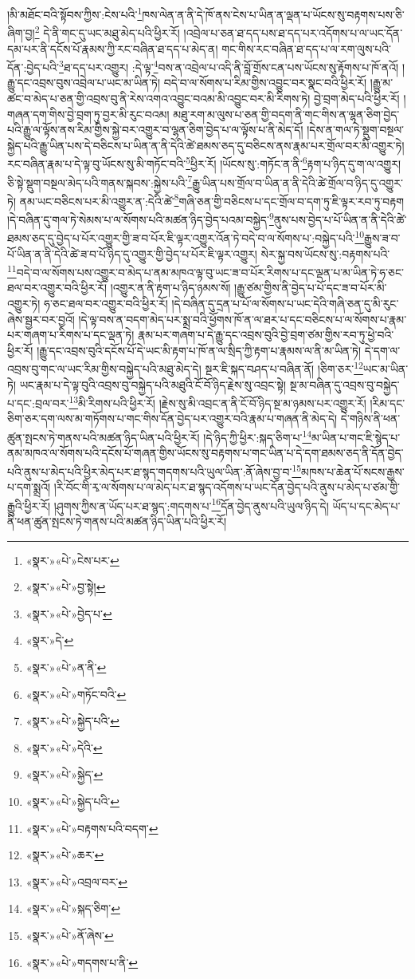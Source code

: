 །མི་མཐོང་བའི་སྟོབས་ཀྱིས་:ངེས་པའི་\footnote{«སྣར་»«པེ་»ངེས་པར་}ཁས་ལེན་ན་ནི་དེ་ཁོ་ནས་ངེས་པ་ཡིན་ན་ལྡན་པ་ཡོངས་སུ་བརྟགས་པས་ཅི་ཞིག་བྱ།\footnote{«སྣར་»«པེ་»བྱ་སྟེ།} དེ་ནི་གང་དུ་ཡང་མཐུ་མེད་པའི་ཕྱིར་རོ། །འབྲེལ་པ་ཅན་ཐ་དད་པས་ཐ་དད་པར་འདོགས་པ་ལ་ཡང་དོན་དམ་པར་ནི་དངོས་པོ་རྣམས་ཀྱི་རང་བཞིན་ཐ་དད་པ་མེད་ན། གང་གིས་རང་བཞིན་ཐ་དད་པ་ལ་རག་ལུས་པའི་དོན་:བྱེད་པའི་\footnote{«སྣར་»«པེ་»བྱེད་པ་}ཐ་དད་པར་འགྱུར། :དེ་ལྟ་\footnote{«སྣར་»དེ་}བས་ན་འབྲེལ་པ་འདི་ནི་བློ་གྲོས་ངན་པས་ཡོངས་སུ་རྟོགས་པ་ཁོ་ནའོ། །རྒྱུ་དང་འབྲས་བུས་འབྲེལ་པ་ཡང་མ་ཡིན་ཏེ། བདེ་བ་ལ་སོགས་པ་རིམ་གྱིས་འབྱུང་བར་སྣང་བའི་ཕྱིར་རོ། །རྒྱུ་མ་ཚང་བ་མེད་པ་ཅན་གྱི་འབྲས་བུ་ནི་རེས་འགའ་འབྱུང་བའམ་མི་འབྱུང་བར་མི་རིགས་ཏེ། བྱེ་བྲག་མེད་པའི་ཕྱིར་རོ། །གཞན་དག་གིས་བྱེ་བྲག་ཏུ་བྱར་མི་རུང་བའམ། མཐུ་རག་མ་ལུས་པ་ཅན་གྱི་བདག་ནི་གང་གིས་ན་ལྷན་ཅིག་བྱེད་པའི་རྒྱུ་ལ་ལྟོས་ནས་རིམ་གྱིས་སྐྱེ་བར་འགྱུར་བ་ལྷན་ཅིག་བྱེད་པ་ལ་ལྟོས་པ་ནི་མེད་དོ། །དེས་ན་གལ་ཏེ་སྡུག་བསྔལ་སྐྱེད་པའི་རྒྱུ་ཡིན་པས་དེ་བཅིངས་པ་ཡིན་ན་ནི་དེའི་ཚེ་ཐམས་ཅད་དུ་བཅིངས་ནས་རྣམ་པར་གྲོལ་བར་མི་འགྱུར་ཏེ། རང་བཞིན་རྣམ་པ་དེ་ལྟ་བུ་ཡོངས་སུ་མི་གཏོང་བའི་\footnote{«སྣར་»«པེ་»ན་ནི་}ཕྱིར་རོ། །ཡོངས་སུ་:གཏོང་ན་ནི་\footnote{«སྣར་»«པེ་»གཏོང་བའི་}རྟག་པ་ཉིད་དུ་ག་ལ་འགྱུར། ཅི་སྟེ་སྡུག་བསྔལ་མེད་པའི་གནས་སྐབས་:སྐྱེས་པའི་\footnote{«སྣར་»«པེ་»སྐྱེད་པའི་}རྒྱུ་ཡིན་པས་གྲོལ་བ་ཡིན་ན་ནི་དེའི་ཚེ་གྲོལ་བ་ཉིད་དུ་འགྱུར་ཏེ། ནམ་ཡང་བཅིངས་པར་མི་འགྱུར་ན་:དེའི་ཚེ་\footnote{«སྣར་»«པེ་»དེའི་}གཞི་ཅན་གྱི་བཅིངས་པ་དང་གྲོལ་བ་དག་ཏུ་ཇི་ལྟར་རབ་ཏུ་བརྟག །དེ་བཞིན་དུ་གལ་ཏེ་སེམས་པ་ལ་སོགས་པའི་མཚན་ཉིད་བྱེད་པའམ་བསྐྱེད་\footnote{«སྣར་»«པེ་»སྐྱེད་}ནུས་པས་བྱེད་པ་པོ་ཡིན་ན་ནི་དེའི་ཚེ་ཐམས་ཅད་དུ་བྱེད་པ་པོར་འགྱུར་གྱི་ཟ་བ་པོར་ཇི་ལྟར་འགྱུར་འོན་ཏེ་བདེ་བ་ལ་སོགས་པ་:བསྐྱེད་པའི་\footnote{«སྣར་»«པེ་»སྐྱེད་པའི་}རྒྱུས་ཟ་བ་པོ་ཡིན་ན་ནི་དེའི་ཚེ་ཟ་བ་པོ་ཉིད་དུ་འགྱུར་གྱི་བྱེད་པ་པོར་ཇི་ལྟར་འགྱུར། སེར་སྐྱ་བས་ཡོངས་སུ་:བརྟགས་པའི་\footnote{«སྣར་»«པེ་»བརྟགས་པའི་བདག་}བདེ་བ་ལ་སོགས་པས་འགྱུར་བ་མེད་པ་ནམ་མཁའ་ལྟ་བུ་ཡང་ཟ་བ་པོར་རིགས་པ་དང་ལྡན་པ་མ་ཡིན་ཏེ་ཧ་ཅང་ཐལ་བར་འགྱུར་བའི་ཕྱིར་རོ། །འགྱུར་ན་ནི་རྟག་པ་ཉིད་ཉམས་སོ། །རྒྱུ་ཙམ་གྱིས་ནི་བྱེད་པ་པོ་དང་ཟ་བ་པོར་མི་འགྱུར་ཏེ། ཧ་ཅང་ཐལ་བར་འགྱུར་བའི་ཕྱིར་རོ། །དེ་བཞིན་དུ་དྲན་པ་པོ་ལ་སོགས་པ་ཡང་དེའི་གཞི་ཅན་དུ་མི་རུང་ཞེས་སྦྱར་བར་བྱའོ། །དེ་ལྟ་བས་ན་བདག་མེད་པར་སྨྲ་བའི་ཕྱོགས་ཁོ་ན་ལ་ཐར་པ་དང་བཅིངས་པ་ལ་སོགས་པ་རྣམ་པར་གཞག་པ་རིགས་པ་དང་ལྡན་ཏེ། རྣམ་པར་གཞག་པ་དེ་རྒྱུ་དང་འབྲས་བུའི་བྱེ་བྲག་ཙམ་གྱིས་རབ་ཏུ་ཕྱེ་བའི་ཕྱིར་རོ། །རྒྱུ་དང་འབྲས་བུའི་དངོས་པོ་དེ་ཡང་མི་རྟག་པ་ཁོ་ན་ལ་སྲིད་ཀྱི་རྟག་པ་རྣམས་ལ་ནི་མ་ཡིན་ཏེ། དེ་དག་ལ་འབྲས་བུ་གང་ལ་ཡང་རིམ་གྱིས་བསྐྱེད་པའི་མཐུ་མེད་དེ། སྔར་ཇི་སྐད་བཤད་པ་བཞིན་ནོ། །ཅིག་ཅར་\footnote{«སྣར་»«པེ་»ཆར་}ཡང་མ་ཡིན་ཏེ། ཡང་རྣམ་པ་དེ་ལྟ་བུའི་འབྲས་བུ་བསྐྱེད་པའི་མཐུའི་ངོ་བོ་ཉིད་རྗེས་སུ་འབྲང་སྟེ། སྔ་མ་བཞིན་དུ་འབྲས་བུ་བསྐྱེད་པ་དང་:བྲལ་བར་\footnote{«སྣར་»«པེ་»འབྲལ་བར་}མི་རིགས་པའི་ཕྱིར་རོ། །རྗེས་སུ་མི་འབྲང་ན་ནི་ངོ་བོ་ཉིད་སྔ་མ་ཉམས་པར་འགྱུར་རོ། །རིམ་དང་ཅིག་ཅར་དག་ལས་མ་གཏོགས་པ་གང་གིས་དོན་བྱེད་པར་འགྱུར་བའི་རྣམ་པ་གཞན་ནི་མེད་དེ། དེ་གཉིས་ནི་ཕན་ཚུན་སྤངས་ཏེ་གནས་པའི་མཚན་ཉིད་ཡིན་པའི་ཕྱིར་རོ། །དེ་ཉིད་ཀྱི་ཕྱིར་:སྐད་ཅིག་པ་\footnote{«སྣར་»«པེ་»སྐད་ཅིག་}མ་ཡིན་པ་གང་ཇི་སྙེད་པ་ནམ་མཁའ་ལ་སོགས་པའི་དངོས་པོ་གཞན་གྱིས་ཡོངས་སུ་བརྟགས་པ་གང་ཡིན་པ་དེ་དག་ཐམས་ཅད་ནི་དོན་བྱེད་པའི་ནུས་པ་མེད་པའི་ཕྱིར་མེད་པར་ཐ་སྙད་གདགས་པའི་ཡུལ་ཡིན་:ནོ་ཞེས་བྱ་བ་\footnote{«སྣར་»«པེ་»ནོ་ཞེས་}མཁས་པ་ཆེན་པོ་སངས་རྒྱས་པ་དག་སྨྲའོ། །རི་བོང་གི་རྭ་ལ་སོགས་པ་ལ་མེད་པར་ཐ་སྙད་འདོགས་པ་ཡང་དོན་བྱེད་པའི་ནུས་པ་མེད་པ་ཙམ་གྱི་རྒྱུའི་ཕྱིར་རོ། །ཤུགས་ཀྱིས་ན་ཡོད་པར་ཐ་སྙད་:གདགས་པ་\footnote{«སྣར་»«པེ་»གདགས་པ་ནི་}དོན་བྱེད་ནུས་པའི་ཡུལ་ཉིད་དེ། ཡོད་པ་དང་མེད་པ་ནི་ཕན་ཚུན་སྤངས་ཏེ་གནས་པའི་མཚན་ཉིད་ཡིན་པའི་ཕྱིར་རོ། 